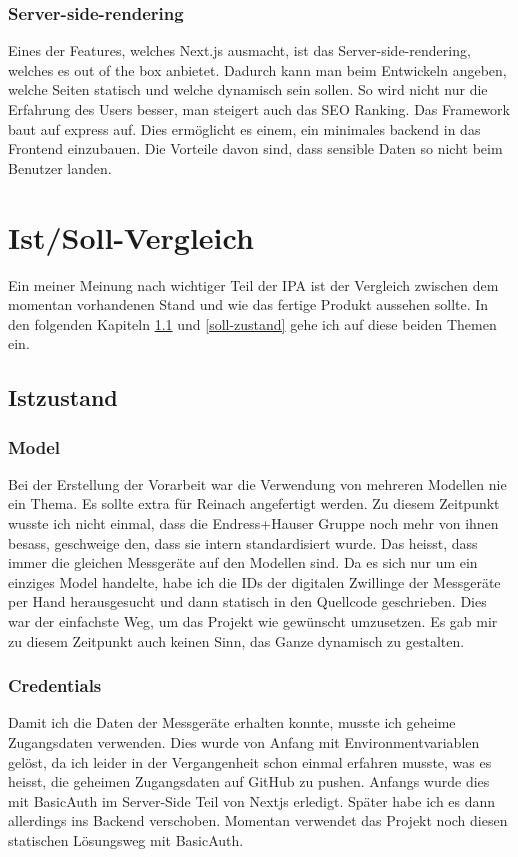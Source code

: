 \subsubsection{Server-side-rendering}
Eines der Features, welches Next.js ausmacht, ist das Server-side-rendering, welches es out of the box anbietet. Dadurch kann man beim Entwickeln angeben, welche Seiten statisch und welche dynamisch sein sollen. So wird nicht nur die Erfahrung des Users besser, man steigert auch das SEO Ranking. Das Framework baut auf express auf. Dies ermöglicht es einem, ein minimales backend in das Frontend einzubauen. Die Vorteile davon sind, dass sensible Daten so nicht beim Benutzer landen.
\section{Ist/Soll-Vergleich}
Ein meiner Meinung nach wichtiger Teil der IPA ist der Vergleich zwischen dem momentan vorhandenen Stand und wie das fertige Produkt aussehen sollte. In den folgenden Kapiteln \ref{ist-zustand} und \ref{soll-zustand} gehe ich auf diese beiden Themen ein.
\subsection{Istzustand} \label{ist-zustand}
\subsubsection{Model}
Bei der Erstellung der Vorarbeit war die Verwendung von mehreren Modellen nie ein Thema. Es sollte extra für Reinach angefertigt werden. Zu diesem Zeitpunkt wusste ich nicht einmal, dass die Endress+Hauser Gruppe noch mehr von ihnen besass, geschweige den, dass sie intern standardisiert wurde. Das heisst, dass immer die gleichen Messgeräte auf den Modellen sind.
\newline
Da es sich nur um ein einziges Model handelte, habe ich die IDs der digitalen Zwillinge der Messgeräte per Hand herausgesucht und dann statisch in den Quellcode geschrieben. Dies war der einfachste Weg, um das Projekt wie gewünscht umzusetzen. Es gab mir zu diesem Zeitpunkt auch keinen Sinn, das Ganze dynamisch zu gestalten.
\subsubsection{Credentials}
Damit ich die Daten der Messgeräte erhalten konnte, musste ich geheime Zugangsdaten verwenden. Dies wurde von Anfang mit Environmentvariablen gelöst, da ich leider in der Vergangenheit schon einmal erfahren musste, was es heisst, die geheimen Zugangsdaten auf GitHub zu pushen. Anfangs wurde dies mit BasicAuth im Server-Side Teil von Nextjs erledigt. Später habe ich es dann allerdings ins Backend verschoben. Momentan verwendet das Projekt noch diesen statischen Lösungsweg mit BasicAuth.
